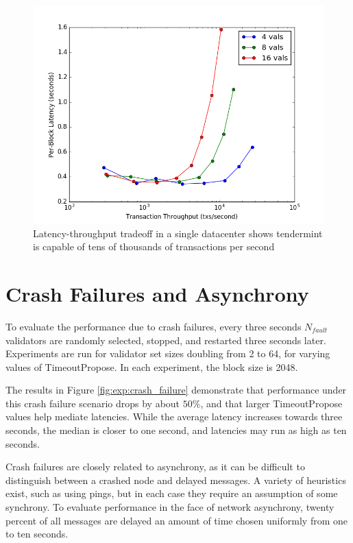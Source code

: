 \begin{figure}[]
	\includegraphics[width=\linewidth,height=\textheight,keepaspectratio]{figures/single_datacenter/latency-throughput.png}
    	\centering
	\caption[Latency-throughput in non-faulty network, single data center]{Latency-throughput tradeoff in a single datacenter shows tendermint is capable of tens of thousands of transactions per second}
	\label{fig:exp:single}
\end{figure}

\section{Crash Failures and Asynchrony}

To evaluate the performance due to crash failures, every three seconds $N_{fault}$ validators are randomly selected,
stopped, and restarted three seconds later.
Experiments are run for validator set sizes doubling from 2 to 64, for varying values of TimeoutPropose.
In each experiment, the block size is 2048.

The results in Figure \ref{fig:exp:crash_failure} demonstrate that performance under this crash failure scenario drops by about 
$50\%$, and that larger TimeoutPropose values help mediate latencies. While the average latency increases towards three seconds,
the median is closer to one second, and latencies may run as high as ten seconds.

Crash failures are closely related to asynchrony, as it can be difficult to distinguish between a crashed node
and delayed messages. A variety of heuristics exist, such as using pings, 
but in each case they require an assumption of some synchrony. 
To evaluate performance in the face of network asynchrony, twenty percent of all messages are delayed an amount of time chosen uniformly 
from one to ten seconds.

